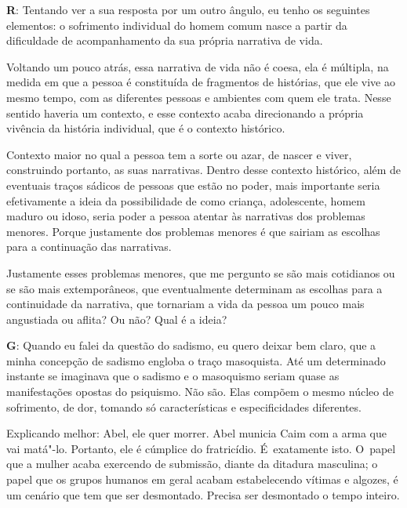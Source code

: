  

\textbf{R}: Tentando ver a sua resposta por um outro ângulo, eu tenho os
seguintes elementos: o sofrimento individual do homem comum nasce a
partir da dificuldade de acompanhamento da sua própria narrativa de
vida.

 

Voltando um pouco atrás, essa narrativa de vida não é coesa, ela é
múltipla, na medida em que a pessoa é constituída de fragmentos de
histórias, que ele vive ao mesmo tempo, com as diferentes pessoas e
ambientes com quem ele trata. Nesse sentido haveria um contexto, e esse
contexto acaba direcionando a própria vivência da história individual,
que é o contexto histórico.

 

Contexto maior no qual a pessoa tem a sorte ou azar, de nascer e viver,
construindo portanto, as suas narrativas. Dentro desse contexto
histórico, além de eventuais traços sádicos de pessoas que estão no
poder, mais importante seria efetivamente a ideia da possibilidade de
como criança, adolescente, homem maduro ou idoso, seria poder a pessoa
atentar às narrativas dos problemas menores. Porque justamente dos
problemas menores é que sairiam as escolhas para a continuação das
narrativas.

 

Justamente esses problemas menores, que me pergunto se são mais
cotidianos ou se são mais extemporâneos, que eventualmente determinam as
escolhas para a continuidade da narrativa, que tornariam a vida da
pessoa um pouco mais angustiada ou aflita? Ou não? Qual é a ideia?

 

\textbf{G}: Quando eu falei da questão do sadismo, eu quero deixar bem
claro, que a minha concepção de sadismo engloba o traço masoquista. Até
um determinado instante se imaginava que o sadismo e o masoquismo
seriam quase as manifestações opostas do psiquismo. Não são. Elas
compõem o mesmo núcleo de sofrimento, de dor, tomando só características
e especificidades diferentes.

 

Explicando melhor: Abel, ele quer morrer. Abel municia Caim com a arma
que vai matá"-lo. Portanto, ele é cúmplice do fratricídio. É~exatamente
isto. O~papel que a mulher acaba exercendo de submissão, diante da
ditadura masculina; o papel que os grupos humanos em geral acabam
estabelecendo vítimas e algozes, é um cenário que tem que ser
desmontado. Precisa ser desmontado o tempo inteiro.

